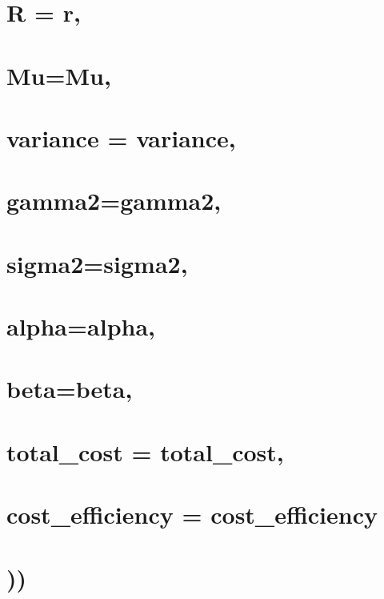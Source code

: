 \documentclass[
]{article}
\begin{document}
\hypertarget{r-r}{%
\section{R = r,}\label{r-r}}

\hypertarget{mumu}{%
\section{Mu=Mu,}\label{mumu}}

\hypertarget{variance-variance}{%
\section{variance = variance,}\label{variance-variance}}

\hypertarget{gamma2gamma2}{%
\section{gamma2=gamma2,}\label{gamma2gamma2}}

\hypertarget{sigma2sigma2}{%
\section{sigma2=sigma2,}\label{sigma2sigma2}}

\hypertarget{alphaalpha}{%
\section{alpha=alpha,}\label{alphaalpha}}

\hypertarget{betabeta}{%
\section{beta=beta,}\label{betabeta}}

\hypertarget{total_cost-total_cost}{%
\section{total\_cost = total\_cost,}\label{total_cost-total_cost}}

\hypertarget{cost_efficiency-cost_efficiency}{%
\section{cost\_efficiency =
cost\_efficiency}\label{cost_efficiency-cost_efficiency}}

\hypertarget{section-22}{%
\section{))}\label{section-22}}
\end{document}
